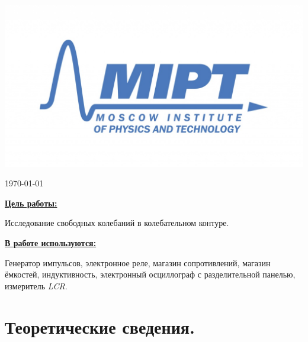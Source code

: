 \documentclass[a4paper, 12pt, twoside]{article}
\newenvironment{bottompar}{\par\vspace*{\fill}}{\clearpage}
\begin{document}
\begin{titlepage}
\begin{bottompar}
	\begin{center}
		\includegraphics[width = 80 mm]{logo.jpg}
	\end{center}
	{\large \today}

\end{bottompar}
\vfill %

\end{titlepage}

{\Large \uline { \textbf  {Цель работы:}}}

\vspace{2mm}

Исследование свободных колебаний в колебательном контуре.

\vspace{\baselineskip}

{\Large \uline { \textbf  {В работе используются:}}}

\vspace{2mm}

Генератор импульсов, электронное реле, магазин сопротивлений, магазин ёмкостей, индуктивность, электронный осциллограф с разделительной панелью, измеритель {\textit{LCR}}.

\section{Теоретические сведения.}
\end{document}
